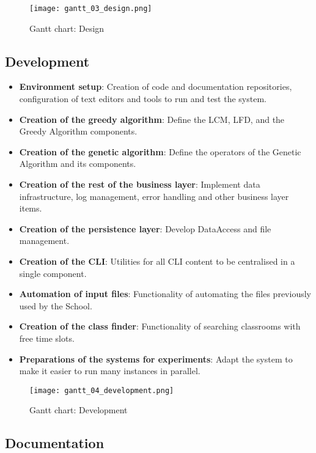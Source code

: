 \begin{figure}[H]
    \caption{Gantt chart: Design}
  \centering
  \texttt{[image: gantt\_03\_design.png]}
\end{figure}


\subsection{Development}

\begin{itemize}
    \item \textbf{Environment setup}: Creation of code and documentation repositories, configuration of text editors and tools to run and test the system.
    \item \textbf{Creation of the greedy algorithm}: Define the LCM, LFD, and the Greedy Algorithm components.
    \item \textbf{Creation of the genetic algorithm}: Define the operators of the Genetic Algorithm and its components.
    \item \textbf{Creation of the rest of the business layer}: Implement data infrastructure, log management, error handling and other business layer items. 
    \item \textbf{Creation of the persistence layer}: Develop DataAccess and file management. 
    \item \textbf{Creation of the CLI}: Utilities for all CLI content to be centralised in a single component.
    \item \textbf{Automation of input files}: Functionality of automating the files previously used by the School.
    \item \textbf{Creation of the class finder}: Functionality of searching classrooms with free time slots.
    \item \textbf{Preparations of the systems for experiments}: Adapt the system to make it easier to run many instances in parallel.
\end{itemize}

\begin{figure}[H]
    \caption{Gantt chart: Development}
  \centering
  \texttt{[image: gantt\_04\_development.png]}
\end{figure}


\subsection{Documentation}

